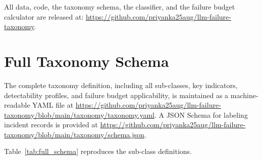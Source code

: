 \documentclass{article}
\begin{document}
All data, code, the taxonomy schema, the classifier, and the failure budget
calculator are released at:
\url{https://github.com/priyanka25aug/llm-failure-taxonomy}.




\appendix
\onecolumn

\section{Full Taxonomy Schema}
\label{appendix:schema}

The complete taxonomy definition, including all sub-classes, key indicators,
detectability profiles, and failure budget applicability, is maintained as a
machine-readable YAML file at
\url{https://github.com/priyanka25aug/llm-failure-taxonomy/blob/main/taxonomy/taxonomy.yaml}.
A JSON Schema for labeling incident records is provided at
\url{https://github.com/priyanka25aug/llm-failure-taxonomy/blob/main/taxonomy/schema.json}.

Table~\ref{tab:full_schema} reproduces the sub-class definitions.
\end{document}
